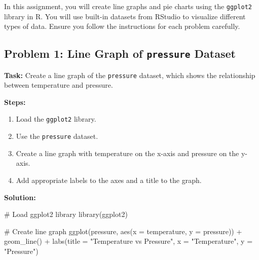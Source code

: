 \documentclass[
  letterpaper,
  DIV=11,
  numbers=noendperiod]{scrreprt}
\newenvironment{Shaded}{\begin{snugshade}}{\end{snugshade}}
\newcommand{\AttributeTok}[1]{\textcolor[rgb]{0.40,0.45,0.13}{#1}}
\newcommand{\CommentTok}[1]{\textcolor[rgb]{0.37,0.37,0.37}{#1}}
\newcommand{\FunctionTok}[1]{\textcolor[rgb]{0.28,0.35,0.67}{#1}}
\newcommand{\NormalTok}[1]{\textcolor[rgb]{0.00,0.23,0.31}{#1}}
\newcommand{\SpecialCharTok}[1]{\textcolor[rgb]{0.37,0.37,0.37}{#1}}
\newcommand{\StringTok}[1]{\textcolor[rgb]{0.13,0.47,0.30}{#1}}
\providecommand{\tightlist}{%
  \setlength{\itemsep}{0pt}\setlength{\parskip}{0pt}}\usepackage{longtable,booktabs,array}
\begin{document}

In this assignment, you will create line graphs and pie charts using the
\texttt{ggplot2} library in R. You will use built-in datasets from
RStudio to visualize different types of data. Ensure you follow the
instructions for each problem carefully.

\subsection*{\texorpdfstring{Problem 1: Line Graph of \texttt{pressure}
Dataset}{Problem 1: Line Graph of pressure Dataset}}\label{problem-1-line-graph-of-pressure-dataset}

\textbf{Task:} Create a line graph of the \texttt{pressure} dataset,
which shows the relationship between temperature and pressure.

\textbf{Steps:}

\begin{enumerate}
\def\labelenumi{\arabic{enumi}.}
\tightlist
\item
  Load the \texttt{ggplot2} library.
\item
  Use the \texttt{pressure} dataset.
\item
  Create a line graph with temperature on the x-axis and pressure on the
  y-axis.
\item
  Add appropriate labels to the axes and a title to the graph.
\end{enumerate}

\textbf{Solution:}

\begin{Shaded}
\begin{Highlighting}[]
\CommentTok{\# Load ggplot2 library}
\FunctionTok{library}\NormalTok{(ggplot2)}

\CommentTok{\# Create line graph}
\FunctionTok{ggplot}\NormalTok{(pressure, }\FunctionTok{aes}\NormalTok{(}\AttributeTok{x =}\NormalTok{ temperature, }\AttributeTok{y =}\NormalTok{ pressure)) }\SpecialCharTok{+}
  \FunctionTok{geom\_line}\NormalTok{() }\SpecialCharTok{+}
  \FunctionTok{labs}\NormalTok{(}\AttributeTok{title =} \StringTok{"Temperature vs Pressure"}\NormalTok{,}
       \AttributeTok{x =} \StringTok{"Temperature"}\NormalTok{,}
       \AttributeTok{y =} \StringTok{"Pressure"}\NormalTok{)}
\end{Highlighting}
\end{Shaded}
\end{document}
